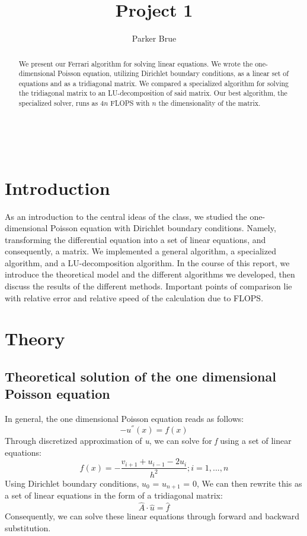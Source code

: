 \documentclass[10pt,showpacs,preprintnumbers,footinbib,amsmath,amssymb,aps,prl,twocolumn,groupedaddress,superscriptaddress,showkeys]{revtex4-1}
\begin{document}
\title{Project 1}
\author{Parker Brue}
\begin{abstract}
We present our Ferrari algorithm for solving linear equations. We wrote the one-dimensional Poisson equation, utilizing Dirichlet boundary conditions, as a linear set of equations and as a tridiagonal matrix. We compared a specialized algorithm for solving the tridiagonal matrix to an LU-decomposition of said matrix.  Our best algorithm, the specialized solver, runs as $4n$ FLOPS with $n$ the dimensionality of the matrix.
\end{abstract}
\maketitle
\
\section{Introduction}
As an introduction to the central ideas of the class, we studied the one-dimensional Poisson equation with Dirichlet boundary conditions. Namely, transforming the differential equation into a set of linear equations, and consequently, a matrix. We implemented a general algorithm, a specialized algorithm, and a LU-decomposition algorithm. In the course of this report, we introduce the theoretical model and the different algorithms  we developed, then discuss the results of the different methods. Important points of comparison lie with relative error and relative speed of the calculation due to FLOPS. 

\section{Theory}
	\subsection{Theoretical solution of the one dimensional Poisson equation}	
In general, the one dimensional Poisson equation reads as follows: \begin{equation} -u^{''}(x) = f(x)     \end{equation}  Through discretized approximation of {\it u}, we can solve for {\it f} using a set of linear equations: \begin{equation}
	f(x)=-\frac{v_{i+1}+u_{i-1}-2u_{i}}{h^{2}}      ;      i=1,...,n
	\end{equation}
Using Dirichlet boundary conditions, $u_{0}$  = $u_{n+1}$ = 0,  We can then rewrite this as a set of linear equations in the form of a tridiagonal matrix: \begin{equation}	
	\hat{A} \cdot \hat{u} = \hat{f}
	\end{equation}
Consequently, we can solve these linear equations through forward and backward substitution.
\end{document}
